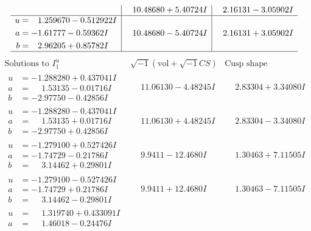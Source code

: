 \documentclass[1p]{elsarticle_modified}
\theoremstyle{definition}
\newcommand{\I}{\sqrt{-1}}
\begin{document}
$$\begin{array}{c|c|c}
 & \phantom{-}10.48680 + 5.40724 I & \phantom{-}2.16131 - 3.05902 I \\ \hline\begin{aligned}
u &= \phantom{-}1.259670 - 0.512922 I \\
a &= -1.61777 - 0.59362 I \\
b &= \phantom{-}2.96205 + 0.85782 I\end{aligned}
 & \phantom{-}10.48680 - 5.40724 I & \phantom{-}2.16131 + 3.05902 I\\
 \hline 
 \end{array}$$\newpage$$\begin{array}{c|c|c}  
\text{Solutions to }I^u_{1}& \I (\text{vol} + \sqrt{-1}CS) & \text{Cusp shape}\\
 \hline 
\begin{aligned}
u &= -1.288280 + 0.437041 I \\
a &= \phantom{-}1.53135 - 0.01716 I \\
b &= -2.97750 - 0.42856 I\end{aligned}
 & \phantom{-}11.06130 - 4.48245 I & \phantom{-}2.83304 + 3.34080 I \\ \hline\begin{aligned}
u &= -1.288280 - 0.437041 I \\
a &= \phantom{-}1.53135 + 0.01716 I \\
b &= -2.97750 + 0.42856 I\end{aligned}
 & \phantom{-}11.06130 + 4.48245 I & \phantom{-}2.83304 - 3.34080 I \\ \hline\begin{aligned}
u &= -1.279100 + 0.527426 I \\
a &= -1.74729 - 0.21786 I \\
b &= \phantom{-}3.14462 + 0.29801 I\end{aligned}
 & \phantom{-}9.9411 - 12.4680 I & \phantom{-}1.30463 + 7.11505 I \\ \hline\begin{aligned}
u &= -1.279100 - 0.527426 I \\
a &= -1.74729 + 0.21786 I \\
b &= \phantom{-}3.14462 - 0.29801 I\end{aligned}
 & \phantom{-}9.9411 + 12.4680 I & \phantom{-}1.30463 - 7.11505 I \\ \hline\begin{aligned}
u &= \phantom{-}1.319740 + 0.433091 I \\
a &= \phantom{-}1.46018 - 0.24476 I \\

\end{aligned}
\end{array}$$
\end{document}
